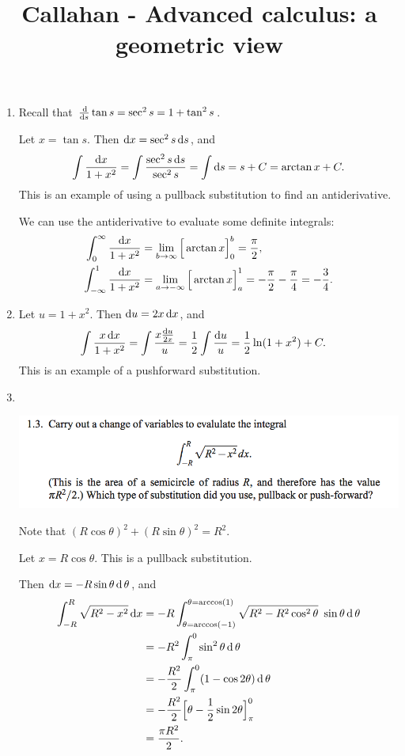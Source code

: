 \documentclass[12pt]{article}
\begin{document}
\title{Callahan - Advanced calculus: a geometric view}
\author{}
\date{}
\maketitle


\begin{enumerate}
\item
  Recall that $\dds \tan s = \sec^2 s = 1 + \tan^2 s$.

  Let $x = \tan s$. Then $\dx = \sec^2 s \ds$, and
  \begin{align*}
      \int \frac{\dx}{1 + x^2}
    = \int \frac{\sec^2 s \ds}{\sec^2 s}
    = \int \ds
    = s + C
    = \arctan x + C.
  \end{align*}
  This is an example of using a pullback substitution to find an antiderivative.

  We can use the antiderivative to evaluate some definite integrals:
  \begin{align*}
      \int_0^\infty \frac{\dx}{1 + x^2}
    &= \lim_{b\to\infty}\Big[\arctan x\Big]_0^b
    = \frac{\pi}{2},\\
      \int_{-\infty}^1 \frac{\dx}{1 + x^2}
    &= \lim_{a\to-\infty}\Big[\arctan x\Big]_a^1
    = -\frac{\pi}{2} - \frac{\pi}{4} = -\frac{3}{4}.
  \end{align*}
\item
  Let $u = 1 + x^2$. Then $\du = 2x \dx$, and
  \begin{align*}
    \int \frac{x \dx}{1 + x^2}
    &= \int \frac{x \frac{\du}{2x}}{u}
     = \frac{1}{2} \int \frac{\du}{u}
     = \frac{1}{2} \ln(1 + x^2) + C.
  \end{align*}
  This is an example of a pushforward substitution.
\item~\\
  \newpage
  \begin{mdframed}
    \includegraphics[width=400pt]{img/calculus--callahan--advanced-calculus-1-3.png}
  \end{mdframed}
  Note that $(R\cos\theta)^2 + (R\sin\theta)^2 = R^2$.

  Let $x = R\cos\theta$. This is a pullback substitution.

  Then $\dx = -R\sin\theta\d\theta$, and
  \begin{align*}
            \int_{-R}^R\sqrt{R^2 - x^2}\dx
    &= -R   \int_{\theta=\arccos(-1)}^{\theta=\arccos(1)}\sqrt{R^2 - R^2\cos^2\theta}~\sin\theta\d\theta\\
    &= -R^2 \int_\pi^0\sin^2\theta\d\theta\\
    &= -\frac{R^2}{2} \int_\pi^0(1 - \cos 2\theta)\d\theta\\
    &= -\frac{R^2}{2} \Big[\theta - \frac{1}{2}\sin 2\theta\Big]_\pi^0\\
    &= \frac{\pi R^2}{2}.
  \end{align*}

\end{enumerate}
\end{document}
